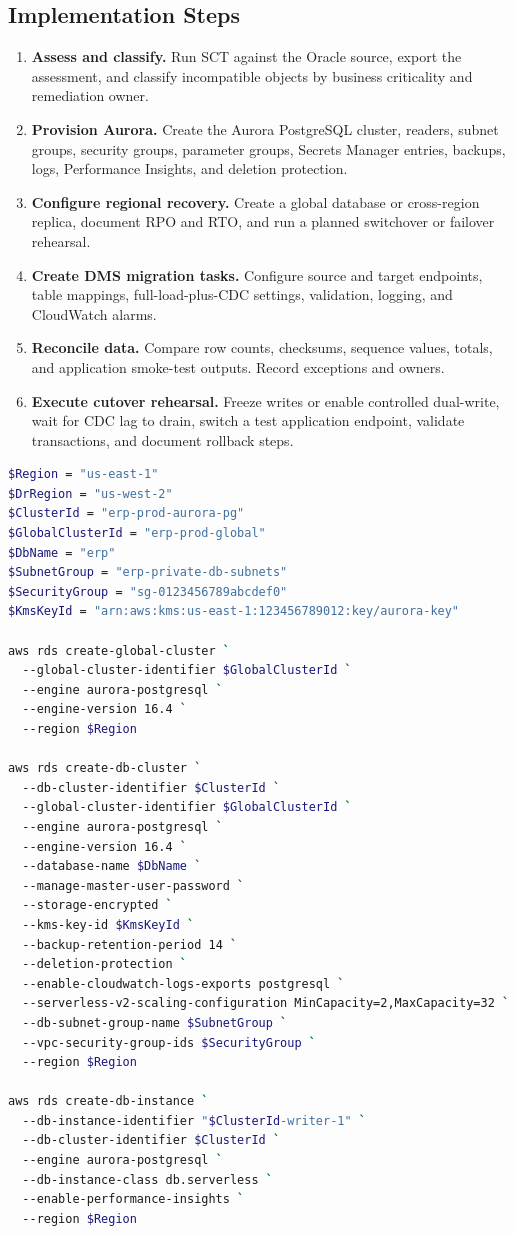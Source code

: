 \subsection*{Implementation Steps}
\begin{enumerate}
    \item \textbf{Assess and classify.} Run SCT against the Oracle source, export the assessment, and classify incompatible objects by business criticality and remediation owner.
    \item \textbf{Provision Aurora.} Create the Aurora PostgreSQL cluster, readers, subnet groups, security groups, parameter groups, Secrets Manager entries, backups, logs, Performance Insights, and deletion protection.
    \item \textbf{Configure regional recovery.} Create a global database or cross-region replica, document RPO and RTO, and run a planned switchover or failover rehearsal.
    \item \textbf{Create DMS migration tasks.} Configure source and target endpoints, table mappings, full-load-plus-CDC settings, validation, logging, and CloudWatch alarms.
    \item \textbf{Reconcile data.} Compare row counts, checksums, sequence values, totals, and application smoke-test outputs. Record exceptions and owners.
    \item \textbf{Execute cutover rehearsal.} Freeze writes or enable controlled dual-write, wait for CDC lag to drain, switch a test application endpoint, validate transactions, and document rollback steps.
\end{enumerate}

\begin{lstlisting}[language=bash,caption={PowerShell-oriented AWS CLI skeleton for Aurora PostgreSQL fleet creation.},label={lst:ch2-capstone-aurora-cli}]
$Region = "us-east-1"
$DrRegion = "us-west-2"
$ClusterId = "erp-prod-aurora-pg"
$GlobalClusterId = "erp-prod-global"
$DbName = "erp"
$SubnetGroup = "erp-private-db-subnets"
$SecurityGroup = "sg-0123456789abcdef0"
$KmsKeyId = "arn:aws:kms:us-east-1:123456789012:key/aurora-key"

aws rds create-global-cluster `
  --global-cluster-identifier $GlobalClusterId `
  --engine aurora-postgresql `
  --engine-version 16.4 `
  --region $Region

aws rds create-db-cluster `
  --db-cluster-identifier $ClusterId `
  --global-cluster-identifier $GlobalClusterId `
  --engine aurora-postgresql `
  --engine-version 16.4 `
  --database-name $DbName `
  --manage-master-user-password `
  --storage-encrypted `
  --kms-key-id $KmsKeyId `
  --backup-retention-period 14 `
  --deletion-protection `
  --enable-cloudwatch-logs-exports postgresql `
  --serverless-v2-scaling-configuration MinCapacity=2,MaxCapacity=32 `
  --db-subnet-group-name $SubnetGroup `
  --vpc-security-group-ids $SecurityGroup `
  --region $Region

aws rds create-db-instance `
  --db-instance-identifier "$ClusterId-writer-1" `
  --db-cluster-identifier $ClusterId `
  --engine aurora-postgresql `
  --db-instance-class db.serverless `
  --enable-performance-insights `
  --region $Region
\end{lstlisting}

